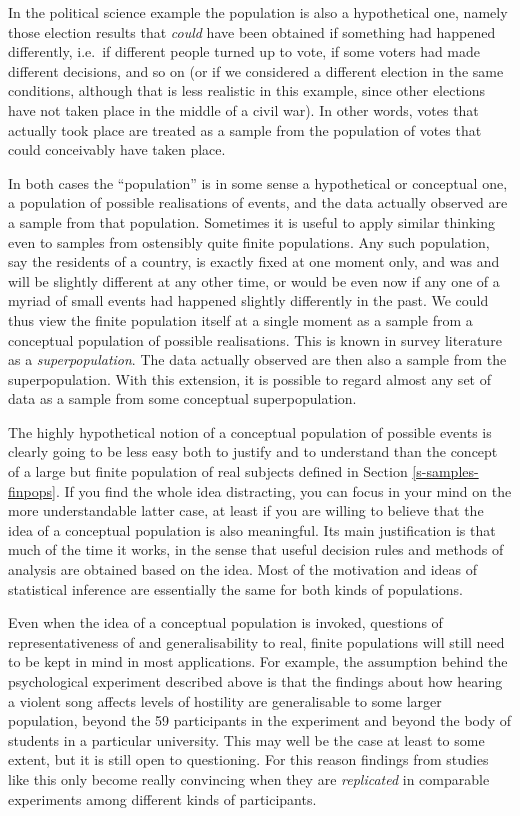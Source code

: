 \documentclass[11pt,a4paper,openany]{book}
\begin{document}
In the political science example the population is also a hypothetical
one, namely those election results that \emph{could} have been obtained
if something had happened differently, i.e.~if different people turned
up to vote, if some voters had made different decisions, and so on (or
if we considered a different election in the same conditions, although
that is less realistic in this example, since other elections have not
taken place in the middle of a civil war). In other words, votes that
actually took place are treated as a sample from the population of votes
that could conceivably have taken place.

In both cases the ``population'' is in some sense a hypothetical or
conceptual one, a population of possible realisations of events, and the
data actually observed are a sample from that population. Sometimes it
is useful to apply similar thinking even to samples from ostensibly
quite finite populations. Any such population, say the residents of a
country, is exactly fixed at one moment only, and was and will be
slightly different at any other time, or would be even now if any one of
a myriad of small events had happened slightly differently in the past.
We could thus view the finite population itself at a single moment as a
sample from a conceptual population of possible realisations. This is
known in survey literature as a \emph{superpopulation}. The data
actually observed are then also a sample from the superpopulation. With
this extension, it is possible to regard almost any set of data as a
sample from some conceptual superpopulation.

The highly hypothetical notion of a conceptual population of possible
events is clearly going to be less easy both to justify and to
understand than the concept of a large but finite population of real
subjects defined in Section \ref{s-samples-finpops}. If you find the
whole idea distracting, you can focus in your mind on the more
understandable latter case, at least if you are willing to believe that
the idea of a conceptual population is also meaningful. Its main
justification is that much of the time it works, in the sense that
useful decision rules and methods of analysis are obtained based on the
idea. Most of the motivation and ideas of statistical inference are
essentially the same for both kinds of populations.

Even when the idea of a conceptual population is invoked, questions of
representativeness of and generalisability to real, finite populations
will still need to be kept in mind in most applications. For example,
the assumption behind the psychological experiment described above is
that the findings about how hearing a violent song affects levels of
hostility are generalisable to some larger population, beyond the 59
participants in the experiment and beyond the body of students in a
particular university. This may well be the case at least to some
extent, but it is still open to questioning. For this reason findings
from studies like this only become really convincing when they are
\emph{replicated} in comparable experiments among different kinds of
participants.
\end{document}

